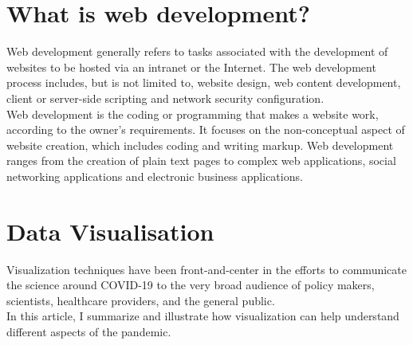 
\section*{What is web development?}
Web development generally refers to tasks associated with the development of websites to
be hosted via an intranet or the Internet. The web development process includes, but is not
limited to, website design, web content development, client or server-side scripting and
network security configuration.\\

Web development is the coding or programming that makes a website work, according to the
owner’s requirements. It focuses on the non-conceptual aspect of website creation, which
includes coding and writing markup.
Web development ranges from the creation of plain text pages to complex web applications,
social networking applications and electronic business applications.
\section*{Data Visualisation}
Visualization techniques have been front-and-center in the efforts to communicate the science around COVID-19 to the very broad audience of policy makers, scientists, healthcare providers, and the general public.\\

In this article, I summarize and illustrate how visualization can help understand different aspects of the pandemic.
